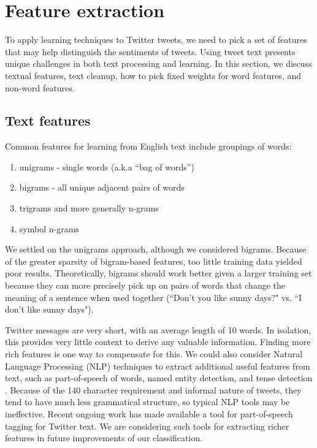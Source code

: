 \section{Feature extraction}
\label{sec:feature}

To apply learning techniques to Twitter tweets, we need to pick a set
of features that may help distinguish the sentiments of tweets. Using
tweet text presents unique challenges in both text processing and
learning. In this section, we discuss textual features, text cleanup,
how to pick fixed weights for word features, and non-word features.

\subsection{Text features}
Common features for learning from English text include groupings of words:

\begin{enumerate}
\item unigrams - single words (a.k.a ``bag of words'')
\item bigrams - all unique adjacent pairs of words
\item trigrams and more generally n-grams
\item symbol n-grams
\end{enumerate}

We settled on the unigrams approach, although we considered bigrams.
Because of the greater sparsity of bigram-based features, too little
training data yielded poor results. Theoretically, bigrams should work
better given a larger training set because they can more precisely
pick up on pairs of words that change the meaning of a sentence when
used together (``Don't you like sunny days?" vs. ``I don't like sunny days").

Twitter messages are very short, with an average length of 10 words. In isolation, this provides very little context to derive any valuable information. Finding more rich features is one way to compensate for this.
We could also consider Natural Language Processing (NLP) techniques to extract additional useful features from text, such as part-of-speech of words, named entity detection, and tense detection \cite{Padro:2010}. Because of the 140 character requirement and informal nature of tweets, they tend to have much less grammatical structure, so typical NLP tools may be ineffective. Recent ongoing work \cite{Gimpel:2011} has made available a tool for part-of-speech tagging for Twitter text. We are considering such tools for extracting richer features in future improvements of our classification.



